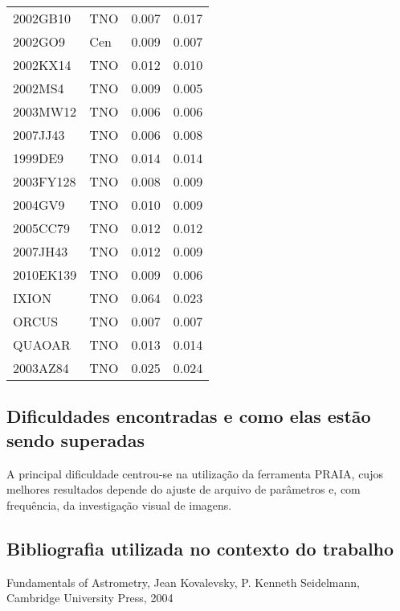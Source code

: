 \documentclass[a4paper, 11pt]{article}
\begin{document}
\begin{table}
\begin{center}
{\begin{tabular}{|l|l|c|c|}
2002GB10    &  TNO &  0.007 & 0.017 \\ 
2002GO9     &  Cen &  0.009 & 0.007 \\ 
2002KX14    &  TNO &  0.012 & 0.010 \\ 
2002MS4     &  TNO &  0.009 & 0.005 \\ 
2003MW12    &  TNO &  0.006 & 0.006 \\ 
2007JJ43    &  TNO &  0.006 & 0.008 \\ 
1999DE9     &  TNO &  0.014 & 0.014 \\ 
2003FY128   &  TNO &  0.008 & 0.009 \\ 
2004GV9     &  TNO &  0.010 & 0.009 \\ 
2005CC79    &  TNO &  0.012 & 0.012 \\ 
2007JH43    &  TNO &  0.012 & 0.009 \\ 
2010EK139   &  TNO &  0.009 & 0.006 \\ 
IXION       &  TNO &  0.064 & 0.023 \\ 
ORCUS       &  TNO &  0.007 & 0.007 \\ 
QUAOAR      &  TNO &  0.013 & 0.014 \\ 
2003AZ84    &  TNO &  0.025 & 0.024 \\ 
\hline
\end{tabular}}
\label{table:incerteza}
\end{center}
\end{table}

\subsection{Dificuldades encontradas e como elas estão sendo superadas}

A principal dificuldade centrou-se na utilização da ferramenta PRAIA, cujos
melhores resultados depende do ajuste de arquivo de parâmetros e, com frequência, da investigação visual de imagens.


\subsection{Bibliografia utilizada no contexto do trabalho}
\noindent Fundamentals of Astrometry, Jean Kovalevsky, P. Kenneth Seidelmann, Cambridge University Press, 2004
\end{document}
